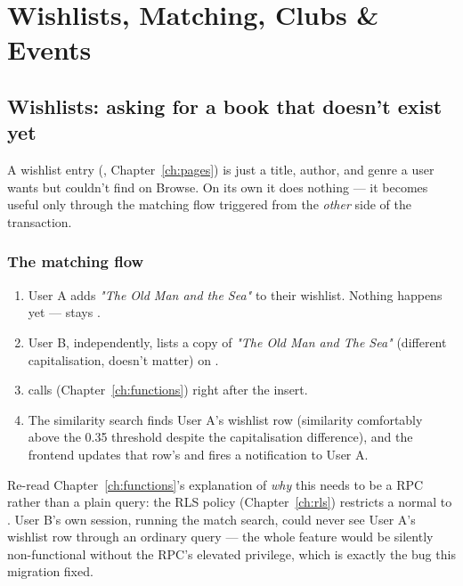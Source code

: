 \chapter{Wishlists, Matching, Clubs \& Events}
\label{ch:wishlists-clubs}

\section{Wishlists: asking for a book that doesn't exist yet}

A wishlist entry (, Chapter~\ref{ch:pages}) is just a title, author, and genre a user wants but couldn't find on Browse. On its own it does nothing — it becomes useful only through the matching flow triggered from the \emph{other} side of the transaction.

\subsection*{The matching flow}

\begin{enumerate}
  \item User A adds \emph{"The Old Man and the Sea"} to their wishlist. Nothing happens yet —  stays .
  \item User B, independently, lists a copy of \emph{"The Old Man and The Sea"} (different capitalisation, doesn't matter) on .
  \item {} calls  (Chapter~\ref{ch:functions}) right after the insert.
  \item The  similarity search finds User A's wishlist row (similarity comfortably above the 0.35 threshold despite the capitalisation difference), and the frontend updates that row's  and fires a notification to User A.
\end{enumerate}

\begin{olknote}
Re-read Chapter~\ref{ch:functions}'s explanation of \emph{why} this needs to be a  RPC rather than a plain query: the  RLS policy (Chapter~\ref{ch:rls}) restricts a normal  to . User B's own session, running the match search, could never see User A's wishlist row through an ordinary query — the whole feature would be silently non-functional without the RPC's elevated privilege, which is exactly the bug this migration fixed.
\end{olknote}

